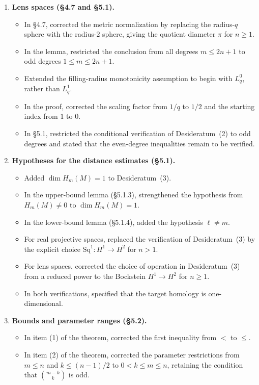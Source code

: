 \begin{enumerate}
\item \textbf{Lens spaces (\S4.7 and \S5.1).}
\begin{itemize}
\item In \S4.7, corrected the metric normalization by replacing the radius-$q$ sphere with the radius-$2$ sphere, giving the quotient diameter $\pi$ for $n\geq1$.
\item In the lemma, restricted the conclusion from all degrees $m\leq2n+1$ to odd degrees $1\leq m\leq2n+1$.
\item Extended the filling-radius monotonicity assumption to begin with $L_q^0$, rather than $L_q^1$.
\item In the proof, corrected the scaling factor from $1/q$ to $1/2$ and the starting index from $1$ to $0$.
\item In \S5.1, restricted the conditional verification of Desideratum~(2) to odd degrees and stated that the even-degree inequalities remain to be verified.
\end{itemize}

\item \textbf{Hypotheses for the distance estimates (\S5.1).}
\begin{itemize}
\item Added $\dim H_m(M)=1$ to Desideratum~(3).
\item In the upper-bound lemma (\S5.1.3), strengthened the hypothesis from $H_m(M)\neq0$ to $\dim H_m(M)=1$.
\item In the lower-bound lemma (\S5.1.4), added the hypothesis $\ell\neq m$.
\item For real projective spaces, replaced the verification of Desideratum~(3) by the explicit choice $\mathrm{Sq}^1:H^1\to H^2$ for $n>1$.
\item For lens spaces, corrected the choice of operation in Desideratum~(3) from a reduced power to the Bockstein $H^1\to H^2$ for $n\geq1$.
\item In both verifications, specified that the target homology is one-dimensional.
\end{itemize}

\item \textbf{Bounds and parameter ranges (\S5.2).}
\begin{itemize}
\item In item (1) of the theorem, corrected the first inequality from $<$ to $\leq$.
\item In item (2) of the theorem, corrected the parameter restrictions from $m\leq n$ and $k\leq(n-1)/2$ to $0<k\leq m\leq n$, retaining the condition that $\binom{m-k}{k}$ is odd.
\end{itemize}
\end{enumerate}

